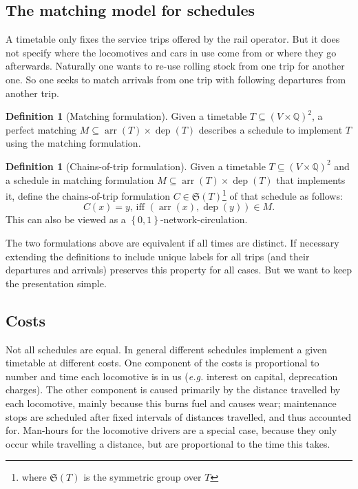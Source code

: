 \documentclass[a4paper]{amsart}
\theoremstyle{definition}
\newtheorem{defn}[theorem]{Definition}
\theoremstyle{remark}
\def\eg{\emph{e.g.}}
\newcommand{\rationals}{\ensuremath{\mathbb{Q}}}
\newcommand{\Sym}{\ensuremath{\mathfrak{S}}}
\newcommand{\lr}[1]{\ensuremath{\left( #1 \right)}}
\newcommand{\lrM}[1]{\ensuremath{\left\{ #1 \right\}}}
\newcommand\dep[0]{\ensuremath{\operatorname{dep}}}
\newcommand\arr[0]{\ensuremath{\operatorname{arr}}}
\begin{document}
\subsection{The matching model for schedules}

A timetable only fixes the service trips offered by the rail operator.  But
it does not specify where the locomotives and cars in use come from or
where they go afterwards.  Naturally one wants to re-use rolling stock
from one trip for another one.  So one seeks to match arrivals from
one trip with following departures from another trip.

\begin{defn}[Matching formulation]
  Given a timetable \(T \subseteq \left(V \times
    \rationals\right)^2\), a perfect matching \(M \subseteq \arr \lr{T} \times \dep \lr{T}\)
  describes a schedule to implement \(T\) using the matching formulation.
\end{defn}
\begin{defn}[Chains-of-trip formulation]
  Given a timetable \(T \subseteq \left(V \times \rationals\right)^2\)
  and a schedule in matching formulation \(M \subseteq \arr \lr{T}
  \times \dep \lr{T}\) that implements it,
  define the chains-of-trip formulation \(C \in \Sym\lr{T}\)\footnote{where \(\Sym \lr{T}\) is the symmetric group over \(T\)} of that schedule as follows:
  \[C \lr{x} = y\text{, iff }\lr{\arr\lr{x},\dep\lr{y}} \in M\text{.}\]
  This can also be viewed as a \(\lrM{0,1}\)-network-circulation.
\end{defn}

The two formulations above are equivalent if all times are distinct.
If necessary extending the definitions to include unique labels for
all trips (and their departures and arrivals) preserves this property
for all cases.  But we want to keep the presentation simple.

\subsection{Costs}

Not all schedules are equal.  In general different schedules implement
a given timetable at different costs.  One component of the costs is
proportional to number and time each locomotive is in us (\eg{}
interest on capital, deprecation charges).  The other component is
caused primarily by the distance travelled by each locomotive, mainly
because this burns fuel and causes wear; maintenance stops are
scheduled after fixed intervals of distances travelled, and thus
accounted for.  Man-hours for the locomotive
drivers are a special case, because they only occur while travelling a
distance, but are proportional to the time this takes.
\end{document}
